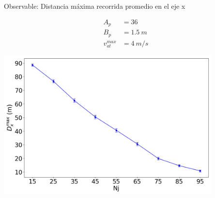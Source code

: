 \begin{frame}{Observable: Distancia máxima recorrida promedio en el eje x}
    \begin{center}
        \begin{minipage}{0.15\textwidth}
            \begin{equation*}
                \begin{aligned}
                    A_p &= 36 \\
                    B_p &= 1.5\ m \\
                    v_{at}^{max} &= 4\ m/s
                \end{aligned}
            \end{equation*}
        \end{minipage}
        \begin{minipage}{0.80\textwidth}
            \hfill\includegraphics[width=0.85\textwidth]{pic/05-resultados/r10}
        \end{minipage}
    \end{center}
    \footnotesize{}
\end{frame}


